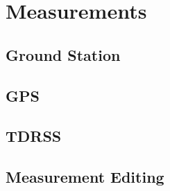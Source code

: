 \section{Measurements}

\subsection{Ground Station}

\subsection{GPS}

\subsection{TDRSS}

\subsection{Measurement Editing}
